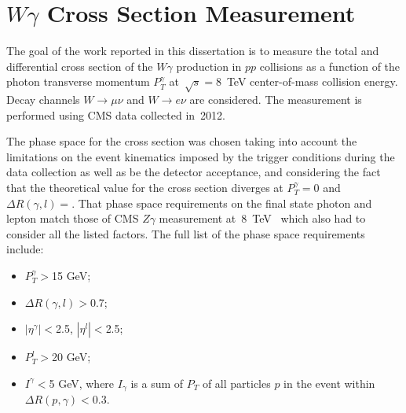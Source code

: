 \chapter{$W\gamma$ Cross Section Measurement}
\label{sec:AN_WgMeas}

The goal of the work reported in this dissertation is to measure the total and differential cross section of the $W\gamma$ production in $pp$ collisions as a function of the photon transverse momentum $P_T^\gamma$ at~$\sqrt{s}=8$~TeV center-of-mass collision energy. Decay channels $W\rightarrow\mu\nu$ and $W\rightarrow e\nu$ are considered. The measurement is performed using CMS data collected in~2012.

The phase space for the cross section was chosen taking into account the limitations on the event kinematics imposed by the trigger conditions during the data collection as well as be the detector acceptance, and considering the fact that the theoretical value for the cross section diverges at $P_T^{\gamma}=$0 and $\Delta{R}(\gamma,l)=$. That phase space requirements on the final state photon and lepton match those of CMS $Z\gamma$ measurement at~8~TeV~\cite{ref_Zg8TeV} which also had to consider all the listed factors. The full list of the phase space requirements include:
\begin{itemize}
  \item $P_T^{\gamma}>$15 GeV;
  \item $\Delta{R}(\gamma,l) > $0.7;
  \item $|\eta^{\gamma}|<$2.5, $|\eta^{l}|<$2.5;
  \item $P_T^{l}>$20 GeV;
  \item $I^{\gamma}<$5 GeV, where $I_{\gamma}$ is a sum of $P_T$ of all particles $p$ in the event within $\Delta{R(p,\gamma)}<$0.3.
\end{itemize}
